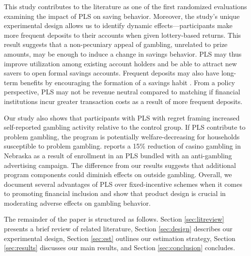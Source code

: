 \documentclass[11pt]{article}
\begin{document}

	This study contributes to the literature as one of the first randomized evaluations examining the impact of PLS on saving behavior. Moreover, the study's unique experimental design allows us to identify dynamic effects---participants make more frequent deposits to their accounts when given lottery-based returns. This result suggests that a non-pecuniary appeal of gambling, unrelated to prize amounts, may be enough to induce a change in savings behavior. PLS may thus improve utilization among existing account holders and be able to attract new savers to open formal savings accounts. Frequent deposits may also have long-term benefits by encouraging the formation of a savings habit . From a policy perspective, PLS may not be revenue neutral compared to matching if financial institutions incur greater transaction costs as a result of more frequent deposits.


	Our study also shows that participants with PLS with regret framing increased self-reported gambling activity relative to the control group. If PLS contribute to problem gambling, the program is potentially welfare-decreasing for households susceptible to problem gambling.  reports a 15\% reduction of casino gambling in Nebraska as a result of enrollment in an PLS bundled with an anti-gambling advertising campaign. The difference from our results suggests that additional program components could diminish effects on outside gambling. Overall, we document several advantages of PLS over fixed-incentive schemes when it comes to promoting financial inclusion and show that product design is crucial in moderating adverse effects on gambling behavior.


	The remainder of the paper is structured as follows. Section \ref{sec:litreview} presents a brief review of related literature, Section \ref{sec:design} describes our experimental design, Section \ref{sec:est} outlines our estimation strategy, Section \ref{sec:results} discusses our main results, and Section \ref{sec:conclusion} concludes.
\end{document}
